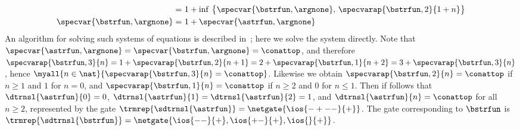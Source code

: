 \begin{example}
\begin{align*}
    =\ &1 + \inf\, \big\{ \specvar{\bstrfun,\argnone},\, \specvarap{\bstrfun,2}{1 + n} \big\}
    \\
    \specvar{\bstrfun,\argnone}
    =\ &1 + \specvar{\astrfun,\argnone}
  \end{align*}
  An algorithm for solving such systems of equations is described
  in~\cite{endr:grab:hend:2008}; here we solve the system directly.
  Note that $\specvar{\astrfun,\argnone} = \specvar{\bstrfun,\argnone} = \conattop$,
  and therefore
  $\specvarap{\bstrfun,3}{n} = 1 + \specvarap{\bstrfun,2}{n+1} = 2 + \specvarap{\bstrfun,1}{n+2} = 3 + \specvarap{\bstrfun,3}{n}$,
  hence $\myall{n \in \nat}{\specvarap{\bstrfun,3}{n} = \conattop}$.
  Likewise we obtain $\specvarap{\bstrfun,2}{n} = \conattop$ if $n \ge 1$ and $1$ for $n = 0$,
  and $\specvarap{\bstrfun,1}{n} = \conattop$ if $n \ge 2$ and $0$ for $n \le 1$.
  Then if follows that $\dtrnsl{\astrfun}{0}=0$, $\dtrnsl{\astrfun}{1}=\dtrnsl{\astrfun}{2}=1$,
  and $\dtrnsl{\astrfun}{n}=\conattop$ for all $n\geq 2$,
  represented by the gate $\trmrep{\sdtrnsl{\astrfun}}=\netgate{\ios{-+--}{+}}$.
  The gate corresponding to $\bstrfun$ is 
  $\trmrep{\sdtrnsl{\bstrfun}}=\netgate{\ios{--}{+},\ios{+-}{+},\ios{}{+}}$.
  \end{example}
